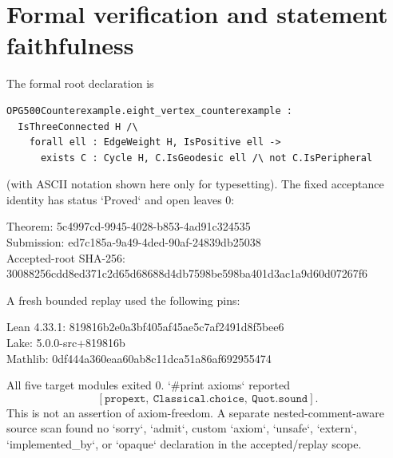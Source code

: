 \documentclass[11pt]{amsart}
\theoremstyle{definition}
\begin{document}
\section{Formal verification and statement faithfulness}\label{sec:verification}

The formal root declaration is
\begin{small}
\begin{verbatim}
OPG500Counterexample.eight_vertex_counterexample :
  IsThreeConnected H /\
    forall ell : EdgeWeight H, IsPositive ell ->
      exists C : Cycle H, C.IsGeodesic ell /\ not C.IsPeripheral
\end{verbatim}
\end{small}
(with ASCII notation shown here only for typesetting).  The fixed acceptance identity has status `Proved` and open leaves $0$:
\begin{center}\scriptsize\ttfamily
Theorem: 5c4997cd-9945-4028-b853-4ad91c324535\\
Submission: ed7c185a-9a49-4ded-90af-24839db25038\\
Accepted-root SHA-256: 30088256cdd8ed371c2d65d68688d4db7598be598ba401d3ac1a9d60d07267f6
\end{center}

A fresh bounded replay used the following pins:
\begin{center}\scriptsize\ttfamily
Lean 4.33.1: 819816b2e0a3bf405af45ae5c7af2491d8f5bee6\\
Lake: 5.0.0-src+819816b\\
Mathlib: 0df444a360eaa60ab8c11dca51a86af692955474
\end{center}
All five target modules exited $0$.  `\#print axioms` reported
\[
 [\texttt{propext},\ \texttt{Classical.choice},\ \texttt{Quot.sound}].
\]
This is not an assertion of axiom-freedom.  A separate nested-comment-aware source scan found no `sorry`, `admit`, custom `axiom`, `unsafe`, `extern`, `implemented\_by`, or `opaque` declaration in the accepted/replay scope.
\end{document}
